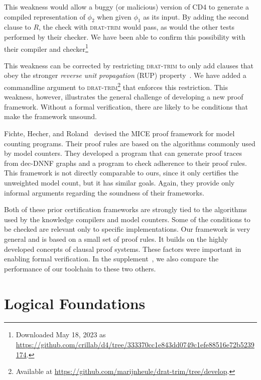 \documentclass[letterpaper,USenglish,cleveref, autoref, thm-restate]{lipics-v2021}
\newcommand{\progname}[1]{\textsc{#1}}
\newcommand{\cdfour}{\progname{CD4}}
\newcommand{\dtrim}{\progname{drat-trim}}
\begin{document}
This weakness would allow a buggy (or malicious) version
of \cdfour{} to generate a compiled representation of $\phi_2$ when
given $\phi_1$ as its input.  By adding the second clause to $R$,
the check with \dtrim{} would pass, as would the other tests performed
by their checker.  We have been able to confirm this possibility with
their compiler and checker\footnote{Downloaded May 18, 2023 as\\
\url{https://github.com/crillab/d4/tree/333370cc1e843dd0749c1efe88516e72b5239174}.}


This weakness can be corrected by restricting \dtrim{} to only add
clauses that obey the stronger \emph{reverse unit propagation} (RUP) property~\cite{goldberg,vangelder08_verifying_rup_proofs}.  We have added a
commandline argument to \dtrim{}\footnote{Available at
\url{https://github.com/marijnheule/drat-trim/tree/develop}.} that enforces this
restriction.  This weakness, however, illustrates the general challenge of
developing a new proof framework.
Without a formal verification, there are likely to be 
conditions that make the framework unsound.

Fichte, Hecher, and Roland~\cite{fichte:sat:2022} devised the MICE
proof framework for model counting programs.  Their proof rules are
based on the algorithms commonly used by model counters.  They
developed a program that can generate proof traces from dec-DNNF
graphs and a program to check adherence to their proof rules.  This
framework is not directly comparable to ours, since it only certifies
the unweighted model count, but it has similar goals.
Again, they provide only  informal arguments 
regarding the soundness of their frameworks.

Both of these prior certification frameworks are strongly tied to the
algorithms used by the knowledge compilers and model counters.  Some
of the conditions to be checked are relevant only to specific
implementations.    Our framework is very general and is based on a small set
of proof rules.  It builds on the highly developed
concepts of clausal proof systems.  These factors were important in enabling formal verification.
In the supplement~\cite{bryant:sat:2023:supplement},
we also compare the performance of our toolchain to these two others.


\section{Logical Foundations}
\label{section:logical:foundations}
\end{document}
